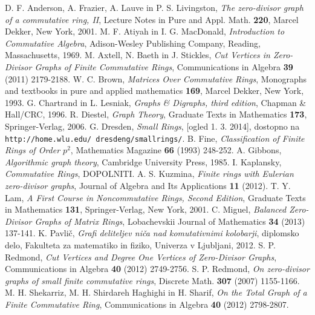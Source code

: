 \documentclass[a4paper, 12pt]{amsart}
\theoremstyle{definition} %
\theoremstyle{plain} %
\begin{document}
\begin{thebibliography}{99}
 D. F. Anderson, A. Frazier, A. Lauve in P. S. Livingston, \emph{The zero-divisor graph of a commutative ring, II}, Lecture Notes in Pure and Appl. Math. {\bf 220}, Marcel Dekker, New York, 2001.
M. F. Atiyah in I. G. MacDonald, \emph{Introduction to Commutative Algebra}, Adison-Wesley Publishing Company, Reading, Massachusetts, 1969.
 M. Axtell, N. Baeth in J. Stickles, \emph{Cut Vertices in Zero-Divisor Graphs of Finite Commutative Rings}, Communications in Algebra {\bf 39} (2011) 2179-2188.
 W. C. Brown, \emph{Matrices Over Commutative Rings}, Monographs and textbooks in pure and applied mathematics {\bf 169}, Marcel Dekker, New York, 1993.
G. Chartrand in L. Lesniak, \emph{Graphs \& Digraphs, third edition}, Chapman \& Hall/CRC,  1996.
R. Diestel, \emph{Graph Theory}, Graduate Texts in Mathematics {\bf 173}, Springer-Verlag, 2006.
 G. Dresden, \emph{Small Rings}, [ogled 1. 3. 2014], dostopno na \texttt{http://home.wlu.edu/~dresdeng/smallrings/}.
B. Fine, \emph{Classification of Finite Rings of Order $p^2$}, Mathematics Magazine {\bf 66} (1993) 248-252. 
A. Gibbons, \emph{Algorithmic graph theory}, Cambridge University Press, 1985.
I. Kaplansky, \emph{Commutative Rings}, DOPOLNITI.
A. S. Kuzmina, \emph{Finite rings with Eulerian zero-divisor graphs}, Journal of Algebra and Its Applications {\bf 11} (2012).
 T. Y. Lam, \emph{A First Course in Noncommutative Rings, Second Edition}, Graduate Texts in Mathematics {\bf 131}, Springer-Verlag, New York, 2001.
C. Miguel, \emph{Balanced Zero-Divisor Graphs of Matrix Rings}, Lobachevskii Journal of Mathematics {\bf 34} (2013) 137-141.
K. Pavlič, \emph{Grafi deliteljev niča nad komutativnimi kolobarji}, diplomsko delo, Fakulteta za matematiko in fiziko, Univerza v Ljubljani, 2012.
 S. P. Redmond, \emph{Cut Vertices and Degree One Vertices of Zero-Divisor Graphs}, Communications in Algebra {\bf 40} (2012) 2749-2756.
 S. P. Redmond, \emph{On zero-divisor graphs of small finite commutative rings}, Discrete Math. {\bf 307} (2007) 1155-1166.
 M. H. Shekarriz, M. H. Shirdareh Haghighi in H.  Sharif, \emph{On the Total Graph of a Finite Commutative Ring}, Communications in Algebra {\bf 40} (2012) 2798-2807.
\end{thebibliography}
\end{document}
